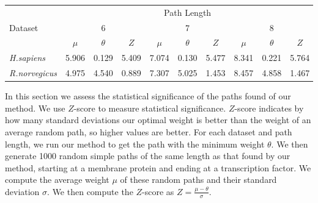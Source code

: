 \documentclass{ws-procs11x85}
\begin{document}
\begin{table}[t]
   {
\begin{tabular}{|l|c|c|c|c|c|c|c|c|c|}
\hline
	&	\multicolumn{9}{c|}{Path Length}		\\ \cline{2-10}
Dataset	&	\multicolumn{3}{c|}{6}	&	\multicolumn{3}{c|}{7}	&
	\multicolumn{3}{c|}{8}	\\
	\cline{2-10} 
		&	\begin{math}\mu\end{math}	&	\begin{math}\theta\end{math}	&
	\begin{math}Z\end{math} & \begin{math}\mu\end{math}	&	\begin{math}\theta\end{math}	&
	\begin{math}Z\end{math} & \begin{math}\mu\end{math}	&
	\begin{math}\theta\end{math}	& \begin{math}Z\end{math}	\\ \hline
{\it H.sapiens}	&	5.906	&	0.129	&	5.409	&	7.074	&	0.130	&	5.477	&	8.341	&
0.221	&	5.764	\\
{\it R.norvegicus}	&	4.975	&	4.540	&	0.889	&	7.307	&	5.025	&	1.453	&
8.457	&	4.858	&	1.467
\\
\hline
\end{tabular}
}
\label{tab:zscore}
\end{table}


In this section we assess the statistical significance of the paths
found of our method. We use $Z$-score to measure statistical
significance. $Z$-score indicates by how many standard deviations our
optimal weight is better than the weight of an average random path, so
higher values are better. For each dataset and path length, we run our
method to get the path with the minimum weight $\theta$. We then
generate 1000 random simple paths of the same length as that found by
our method, starting at a membrane protein and ending at a
transcription factor.  We compute the average weight $\mu$ of these
random paths and their standard deviation $\sigma$. We then compute
the $Z$-score as $Z = \frac{\mu - \theta}{\sigma}$.
\end{document}
